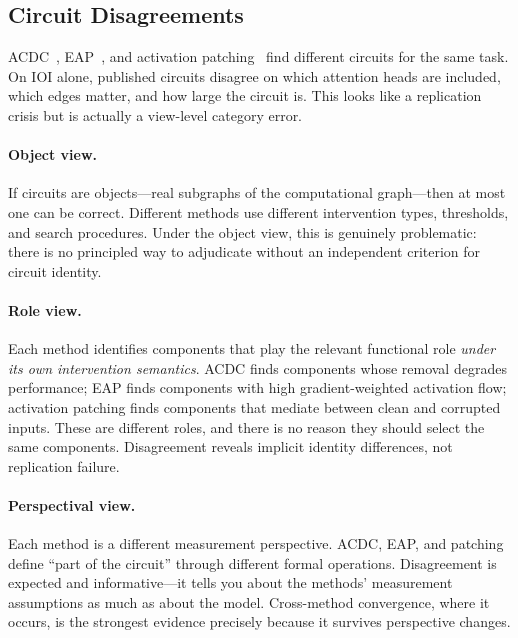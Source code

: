 \documentclass{article}
\begin{document}

\subsection{Circuit Disagreements}\label{app:cs_circuit}

ACDC~\citep{conmy2023acdc}, EAP~\citep{syed2023eap}, and activation
patching~\citep{wang2022} find different circuits for the same task. On
IOI alone, published circuits disagree on which attention heads are
included, which edges matter, and how large the circuit is. This looks
like a replication crisis but is actually a view-level category error.

\paragraph{Object view.}
If circuits are objects---real subgraphs of the computational graph---then
at most one can be correct. Different methods use different intervention
types, thresholds, and search procedures. Under the object view, this is
genuinely problematic: there is no principled way to adjudicate without
an independent criterion for circuit identity.

\paragraph{Role view.}
Each method identifies components that play the relevant functional role
\emph{under its own intervention semantics}. ACDC finds components whose
removal degrades performance; EAP finds components with high
gradient-weighted activation flow; activation patching finds components
that mediate between clean and corrupted inputs. These are different
roles, and there is no reason they should select the same components.
Disagreement reveals implicit identity differences, not replication
failure.

\paragraph{Perspectival view.}
Each method is a different measurement perspective. ACDC, EAP, and
patching define ``part of the circuit'' through different formal
operations. Disagreement is expected and informative---it tells you about
the methods' measurement assumptions as much as about the model.
Cross-method convergence, where it occurs, is the strongest evidence
precisely because it survives perspective changes.
\end{document}
